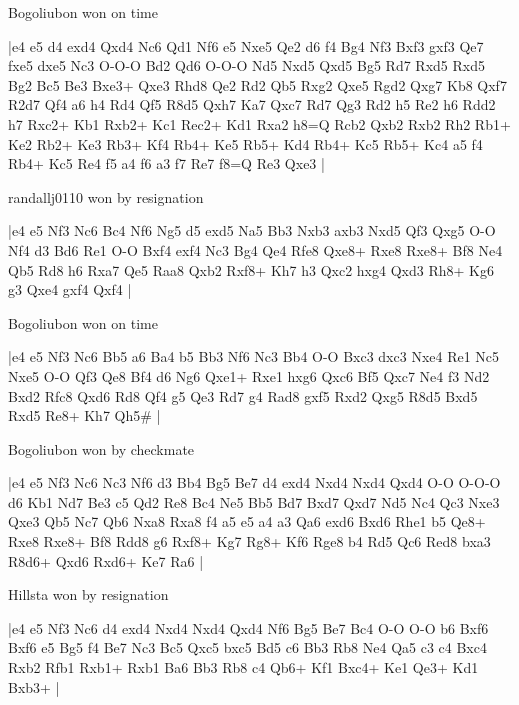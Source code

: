\showboard

Bogoliubon won on time

\makegametitle
|e4 e5 d4 exd4 Qxd4 Nc6 Qd1 Nf6 e5 Nxe5 Qe2 d6 f4 Bg4 Nf3 Bxf3 gxf3 Qe7 fxe5 dxe5 Nc3 O-O-O Bd2 Qd6 O-O-O Nd5 Nxd5 Qxd5 Bg5 Rd7 Rxd5 Rxd5 Bg2 Bc5 Be3 Bxe3+ Qxe3 Rhd8 Qe2 Rd2 Qb5 Rxg2 Qxe5 Rgd2 Qxg7 Kb8 Qxf7 R2d7 Qf4 a6 h4 Rd4 Qf5 R8d5 Qxh7 Ka7 Qxc7 Rd7 Qg3 Rd2 h5 Re2 h6 Rdd2 h7 Rxc2+ Kb1 Rxb2+ Kc1 Rec2+ Kd1 Rxa2 h8=Q Rcb2 Qxb2 Rxb2 Rh2 Rb1+ Ke2 Rb2+ Ke3 Rb3+ Kf4 Rb4+ Ke5 Rb5+ Kd4 Rb4+ Kc5 Rb5+ Kc4 a5 f4 Rb4+ Kc5 Re4 f5 a4 f6 a3 f7 Re7 f8=Q Re3 Qxe3  |

\showboard

randallj0110 won by resignation

\makegametitle
|e4 e5 Nf3 Nc6 Bc4 Nf6 Ng5 d5 exd5 Na5 Bb3 Nxb3 axb3 Nxd5 Qf3 Qxg5 O-O Nf4 d3 Bd6 Re1 O-O Bxf4 exf4 Nc3 Bg4 Qe4 Rfe8 Qxe8+ Rxe8 Rxe8+ Bf8 Ne4 Qb5 Rd8 h6 Rxa7 Qe5 Raa8 Qxb2 Rxf8+ Kh7 h3 Qxc2 hxg4 Qxd3 Rh8+ Kg6 g3 Qxe4 gxf4 Qxf4  |

\showboard

Bogoliubon won on time

\makegametitle
|e4 e5 Nf3 Nc6 Bb5 a6 Ba4 b5 Bb3 Nf6 Nc3 Bb4 O-O Bxc3 dxc3 Nxe4 Re1 Nc5 Nxe5 O-O Qf3 Qe8 Bf4 d6 Ng6 Qxe1+ Rxe1 hxg6 Qxc6 Bf5 Qxc7 Ne4 f3 Nd2 Bxd2 Rfc8 Qxd6 Rd8 Qf4 g5 Qe3 Rd7 g4 Rad8 gxf5 Rxd2 Qxg5 R8d5 Bxd5 Rxd5 Re8+ Kh7 Qh5\#  |

\showboard

Bogoliubon won by checkmate

\makegametitle
|e4 e5 Nf3 Nc6 Nc3 Nf6 d3 Bb4 Bg5 Be7 d4 exd4 Nxd4 Nxd4 Qxd4 O-O O-O-O d6 Kb1 Nd7 Be3 c5 Qd2 Re8 Bc4 Ne5 Bb5 Bd7 Bxd7 Qxd7 Nd5 Nc4 Qc3 Nxe3 Qxe3 Qb5 Nc7 Qb6 Nxa8 Rxa8 f4 a5 e5 a4 a3 Qa6 exd6 Bxd6 Rhe1 b5 Qe8+ Rxe8 Rxe8+ Bf8 Rdd8 g6 Rxf8+ Kg7 Rg8+ Kf6 Rge8 b4 Rd5 Qc6 Red8 bxa3 R8d6+ Qxd6 Rxd6+ Ke7 Ra6  |

\showboard

Hillsta won by resignation

\makegametitle
|e4 e5 Nf3 Nc6 d4 exd4 Nxd4 Nxd4 Qxd4 Nf6 Bg5 Be7 Bc4 O-O O-O b6 Bxf6 Bxf6 e5 Bg5 f4 Be7 Nc3 Bc5 Qxc5 bxc5 Bd5 c6 Bb3 Rb8 Ne4 Qa5 c3 c4 Bxc4 Rxb2 Rfb1 Rxb1+ Rxb1 Ba6 Bb3 Rb8 c4 Qb6+ Kf1 Bxc4+ Ke1 Qe3+ Kd1 Bxb3+  |

